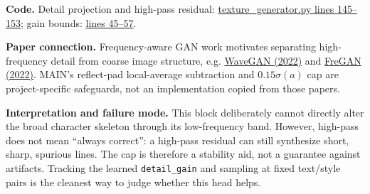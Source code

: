 \documentclass[10pt,a4paper]{article}
\newcommand{\paper}[2]{\href{#1}{#2}}
\begin{document}
\textbf{Code.}  Detail projection and high-pass residual: \href{https://github.com/rquq/HGGAN_test/blob/main/networks/texture_generator.py\#L145-L153}{texture\_generator.py lines 145--153}; gain bounds: \href{https://github.com/rquq/HGGAN_test/blob/main/networks/texture_generator.py\#L45-L57}{lines 45--57}.

\textbf{Paper connection.}  Frequency-aware GAN work motivates separating high-frequency detail from coarse image structure, e.g. \paper{https://arxiv.org/abs/2207.07288}{WaveGAN (2022)} and \paper{https://arxiv.org/abs/2210.05461}{FreGAN (2022)}.  MAIN's reflect-pad local-average subtraction and $0.15\sigma(a)$ cap are project-specific safeguards, not an implementation copied from those papers.

\begin{center}
\end{center}

\textbf{Interpretation and failure mode.}  This block deliberately cannot directly alter the broad character skeleton through its low-frequency band.  However, high-pass does not mean ``always correct'': a high-pass residual can still synthesize short, sharp, spurious lines.  The cap is therefore a stability aid, not a guarantee against artifacts.  Tracking the learned \texttt{detail\_gain} and sampling at fixed text/style pairs is the cleanest way to judge whether this head helps.
\end{document}

